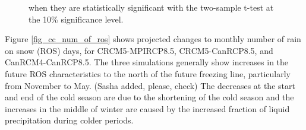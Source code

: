 \documentclass[a0,landscape]{a0poster}
\begin{document}
\begin{multicols*}{4}
\begin{minipage}[t]{\linewidth}
\begin{figure}
{                                  when they are statistically significant with the two-sample t-test at the 10\%
                                  significance level.
                                  }
\end{figure}
Figure \ref{fig_cc_num_of_ros} shows
projected changes to monthly number of rain on snow (ROS) days, for CRCM5-MPIRCP8.5, CRCM5-CanRCP8.5, and CanRCM4-CanRCP8.5. The three
simulations generally show increases in the future ROS characteristics to the
north of the future freezing line, particularly from November to May. (Sasha
added, please, check) The decreases at the start and end of the cold season are
due to the shortening of the cold season and the increases in the middle of
winter are caused by the increased fraction of liquid precipitation during
colder periods.

\endgroup
\end{minipage}
\vspace{2cm}



\end{multicols*}
\end{document}
